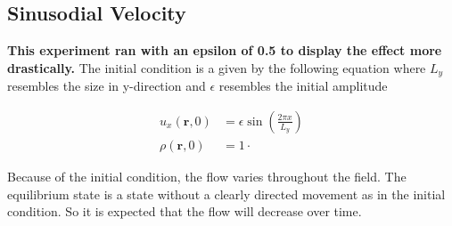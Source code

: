 \subsection{Sinusodial Velocity}
\textbf{This experiment ran with an epsilon of 0.5 to display the effect more drastically.}
The initial condition is a given by the following equation where $L_y$ resembles the size in y-direction and $\epsilon$ resembles the initial amplitude

\begin{equation*}
    \begin{aligned}
        u_x(\mathbf{r},0) &= \epsilon \sin \left( \frac{2 \pi x}{L_y} \right) \\
        \rho(\mathbf{r},0) &= 1 \cdot
    \end{aligned}
\end{equation*}

Because of the initial condition, the flow varies throughout the field.
The equilibrium state is a state without a clearly directed movement as in the initial condition.
So it is expected that the flow will decrease over time.

